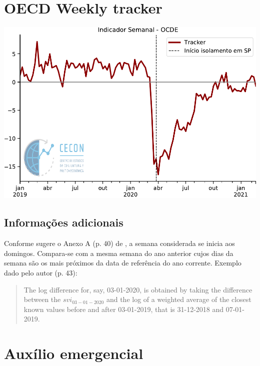 \documentclass{SelfArx}
\begin{document}
\section*{OECD Weekly tracker}
\label{sec:orgdd3a75d}

\begin{center}
\includegraphics[width=.9\linewidth]{./figs/Granulares/OCDE_Semanal.pdf}
\end{center}

\subsection*{Informações adicionais}
\label{sec:org3f6f80e}

Conforme sugere o Anexo A (p. 40) de \textcite{woloszko_2020_Tracking}, a semana considerada se inicia aos domingos.
Compara-se com a mesma semana do ano anterior cujos dias da semana são os mais próximos da data de referência do ano corrente.
Exemplo dado pelo autor (p. 43):

\begin{quote}
The log difference for, say, 03-01-2020, is obtained by taking the difference between the \(svi_{03-01-2020}\) and the log of a weighted average of the closest known values before and after 03-01-2019, that is 31-12-2018 and 07-01-2019.
\end{quote}


\section*{Auxílio emergencial}
\label{sec:org0b2cecb}

\npdecimalsign{,}
\begin{figure}[h]
    \resizebox{\textwidth}{!}{%
    } 
\end{figure}
\end{document}
